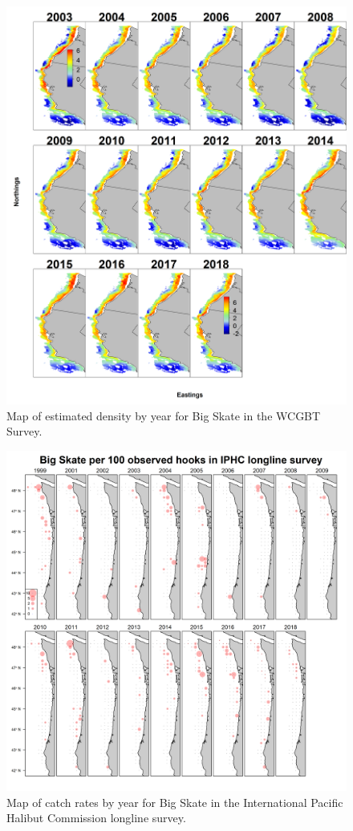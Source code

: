 \documentclass[12pt,]{article}
\begin{document}
\begin{figure}
\centering
\includegraphics{Figures/VAST_Yearly_Dens_WCGBTS.png}
\caption{Map of estimated density by year for Big Skate in the WCGBT
Survey. \label{fig:VAST_Yearly_Dens_Triennial}}
\end{figure}

\begin{figure}
\centering
\includegraphics{Figures/IPHC_BigSkate_map.png}
\caption{Map of catch rates by year for Big Skate in the International
Pacific Halibut Commission longline survey. \label{fig:IPHC_map}}
\end{figure}
\end{document}
